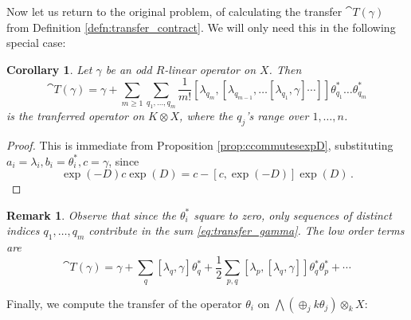 \documentclass[english,letter paper,12pt,leqno]{article}
\newtheorem{corollary}[theorem]{Corollary}
\theoremstyle{example}
\newtheorem{remark}[theorem]{Remark}
\numberwithin{equation}{section}
\def\be{\begin{equation}}
\def\ee{\end{equation}}
\DeclareMathOperator{\At}{At}
\begin{document}
Now let us return to the original problem, of calculating the transfer $\cat{T}(\gamma)$ from Definition \ref{defn:transfer_contract}. We will only need this in the following special case:

\begin{corollary}\label{corollary_transfergamma} Let $\gamma$ be an odd $R$-linear operator on $X$. Then
\be\label{eq:transfer_gamma}
\cat{T}(\gamma) = \gamma + \sum_{m \ge 1} \sum_{q_1,\ldots,q_m}  \frac{1}{m!} [\lambda_{q_m}, [\lambda_{q_{m-1}}, \ldots [ \lambda_{q_1}, \gamma] \cdots ]] \theta^*_{q_1} \ldots \theta^*_{q_m}
\ee
is the tranferred operator on $K \otimes X$, where the $q_j$'s range over $1, \ldots, n$.
\end{corollary}
\begin{proof}
This is immediate from Proposition \ref{prop:ccommutesexpD}, substituting $a_i = \lambda_i, b_i = \theta_i^*,c = \gamma$, since
\[
\exp(-D) c \exp(D) = c - [c, \exp(-D)] \exp(D)\,.
\]
\end{proof}


\begin{remark} Observe that since the $\theta_i^*$ square to zero, only sequences of distinct indices $q_1,\ldots,q_m$ contribute in the sum \eqref{eq:transfer_gamma}. The low order terms are
\be
\cat{T}(\gamma) = \gamma + \sum_q [\lambda_q, \gamma] \theta^*_q + \frac{1}{2} \sum_{p,q} [\lambda_p, [\lambda_q, \gamma]] \theta_q^*\theta_p^* + \cdots
\ee
\end{remark}

Finally, we compute the transfer of the operator $\theta_i$ on $\bigwedge( \oplus_j k \theta_j ) \otimes_k X$:
\end{document}
